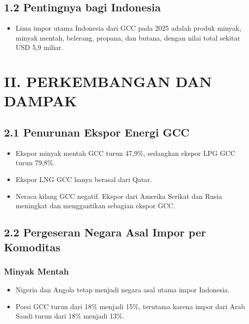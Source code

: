 \documentclass[
  manuscript=article,
  layout=brief,
  year=2026,
  volume=1,
]{den}
\providecommand{\tightlist}{%
  \setlength{\itemsep}{0pt}\setlength{\parskip}{0pt}}
\begin{document}
\subsection{1.2 Pentingnya bagi
Indonesia}\label{pentingnya-bagi-indonesia}

\begin{itemize}
\tightlist
\item
  Lima impor utama Indonesia dari GCC pada 2025 adalah produk minyak,
  minyak mentah, belerang, propana, dan butana, dengan nilai total
  sekitar USD 5,9 miliar.
\end{itemize}

\section{II. PERKEMBANGAN DAN DAMPAK}\label{ii.-perkembangan-dan-dampak}

\subsection{2.1 Penurunan Ekspor Energi
GCC}\label{penurunan-ekspor-energi-gcc}

\begin{itemize}
\tightlist
\item
  Ekspor minyak mentah GCC turun 47,9\%, sedangkan ekspor LPG GCC turun
  79,8\%.
\item
  Ekspor LNG GCC hanya berasal dari Qatar.
\item
  Neraca kilang GCC negatif. Ekspor dari Amerika Serikat dan Rusia
  meningkat dan menggantikan sebagian ekspor GCC.
\end{itemize}

\subsection{2.2 Pergeseran Negara Asal Impor per
Komoditas}\label{pergeseran-negara-asal-impor-per-komoditas}

\subsubsection{Minyak Mentah}\label{minyak-mentah}

\begin{itemize}
\tightlist
\item
  Nigeria dan Angola tetap menjadi negara asal utama impor Indonesia.
\item
  Porsi GCC turun dari 18\% menjadi 15\%, terutama karena impor dari
  Arab Saudi turun dari 18\% menjadi 13\%.
\end{itemize}
\end{document}
